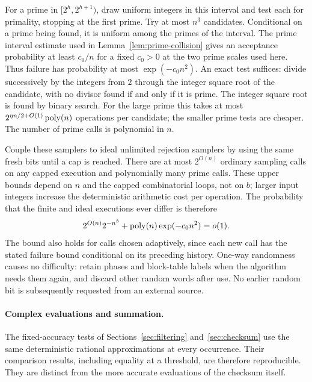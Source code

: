 For a prime in $[2^h,2^{h+1})$, draw uniform integers in this interval and
test each for primality, stopping at the first prime.  Try at most $n^3$
candidates.  Conditional on a prime being found, it is uniform among the
primes of the interval.  The prime interval estimate used in
Lemma~\ref{lem:prime-collision} gives an acceptance probability at least
$c_0/n$ for a fixed $c_0>0$ at the two prime scales used here.  Thus failure
has probability at most $\exp(-c_0n^2)$.  An exact test suffices: divide
successively by the integers from $2$ through the integer square root of
the candidate, with no divisor found if and only if it is prime.  The
integer square root is found by binary search.  For the
large prime this takes at most
$2^{\eta n/2+O(1)}\operatorname{poly}(n)$ operations per candidate; the smaller prime
tests are cheaper.  The number of prime calls is polynomial in $n$.

Couple these samplers to ideal unlimited rejection samplers by using the
same fresh bits until a cap is reached.  There are at most $2^{O(n)}$
ordinary sampling calls on any capped execution and polynomially many
prime calls.  These upper bounds depend on $n$ and the capped combinatorial
loops, not on $b$; larger input integers increase the deterministic
arithmetic cost per operation.  The probability that the finite
and ideal executions ever differ is therefore
\begin{equation}
 2^{O(n)}2^{-n^3}+\operatorname{poly}(n)\exp(-c_0n^2)=o(1).
 \label{eq:sampling-coupling}
\end{equation}
The bound also holds for calls chosen adaptively, since each new call has
the stated failure bound conditional on its preceding history.  One-way
randomness causes no difficulty: retain phases and block-table labels
when the algorithm needs them again, and discard other random words
after use.  No earlier random bit is subsequently requested from an
external source.

\paragraph{Complex evaluations and summation.}
\label{par:complex-evaluations}
The fixed-accuracy tests of Sections~\ref{sec:filtering}
and~\ref{sec:checksum} use the same deterministic rational approximations
at every occurrence.  Their comparison results, including equality at a
threshold, are therefore reproducible.  They are distinct from the more
accurate evaluations of the checksum itself.

